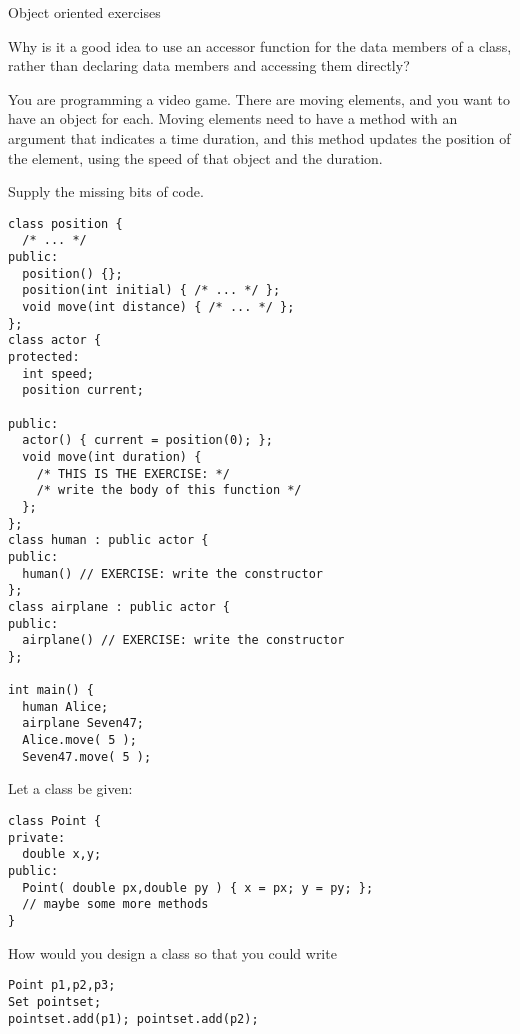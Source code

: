 
 {Object oriented exercises}

\begin{exercise}
  Why is it a good idea to use an accessor function for the data
  members of a class, rather than
  declaring data members  and accessing them directly?
\end{exercise}

\begin{exercise}
  You are programming a video game. There are moving elements, and you
  want to have an object for each. Moving elements need to have a
  method  with an argument that indicates a time duration, and
  this method updates the position of the element, using the speed of
  that object and the duration.

  Supply the missing bits of code.
\begin{verbatim}
class position {
  /* ... */
public:
  position() {};
  position(int initial) { /* ... */ };
  void move(int distance) { /* ... */ };
};
class actor {
protected:
  int speed;
  position current;

public:
  actor() { current = position(0); };
  void move(int duration) {
    /* THIS IS THE EXERCISE: */
    /* write the body of this function */
  };
};
class human : public actor {
public:
  human() // EXERCISE: write the constructor
};
class airplane : public actor {
public:
  airplane() // EXERCISE: write the constructor
};

int main() {
  human Alice;
  airplane Seven47;
  Alice.move( 5 );
  Seven47.move( 5 );
\end{verbatim}
\end{exercise}

\begin{exercise}
  Let a  class be given:
\begin{verbatim}
class Point {
private: 
  double x,y;
public:
  Point( double px,double py ) { x = px; y = py; };
  // maybe some more methods
}
\end{verbatim}
How would you design a  class so that you could write
\begin{verbatim}
Point p1,p2,p3;
Set pointset;
pointset.add(p1); pointset.add(p2);
\end{verbatim}
\end{exercise}


